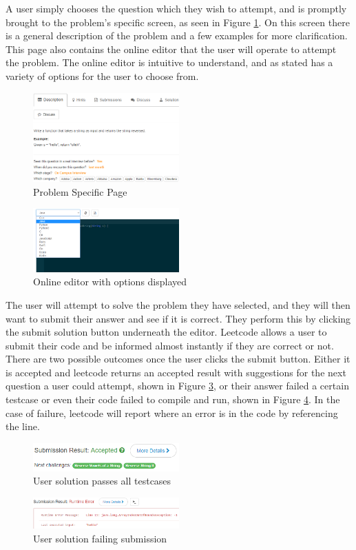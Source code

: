 \documentclass[10pt,twocolumn]{IEEEtran}
\begin{document}
A user simply chooses the question which they wish to attempt, and is promptly brought to the problem's specific screen, as seen in Figure \ref{fig:problemPage}. On this screen there is a general description of the problem and a few examples for more clarification. This page also contains the online editor that the user will operate to attempt the problem. The online editor is intuitive to understand, and as stated has a variety of options for the user to choose from. 
\begin{figure}[h]
\includegraphics[width=0.5\textwidth]{problemPage.png}
\caption{Problem Specific Page}
\label{fig:problemPage}
\end{figure}

\begin{figure}[h]
\includegraphics[width=0.5\textwidth]{languageUI.png}
\caption{Online editor with options displayed}
\label{fig:langUI}
\end{figure}   
The user will attempt to solve the problem they have selected, and they will then want to submit their answer and see if it is correct. They perform this by clicking the submit solution button underneath the editor. Leetcode allows a user to submit their code and be informed almost instantly if they are correct or not. There are two possible outcomes once the user clicks the submit button. Either it is accepted and leetcode returns an accepted result with suggestions for the next question a user could attempt, shown in Figure \ref{fig:accepted}, or their answer failed a certain testcase or even their code failed to compile and run, shown in Figure \ref{fig:fail}. In the case of failure, leetcode will report where an error is in the code by referencing the line.  
\begin{figure}[h]
\includegraphics[width=0.5\textwidth]{accepted.png}
\caption{User solution passes all testcases}
\label{fig:accepted}
\end{figure}  
\begin{figure}[h]
\includegraphics[width=0.5\textwidth]{failure.png}
\caption{User solution failing submission}
\label{fig:fail}
\end{figure}    
\end{document}
